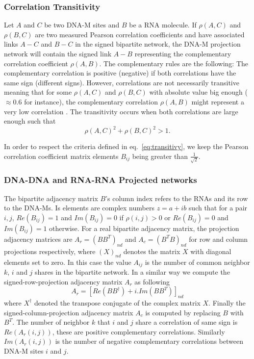 \documentclass[10pt,a4paper]{article}
\begin{document}
\subsubsection{Correlation Transitivity}
Let $A$ and $C$ be two DNA-M sites and $B$ be a RNA molecule. If $\rho(A,C)$ and $\rho(B,C)$ are two measured Pearson correlation coefficients and have associated links $A-C$ and $B-C$ in the signed bipartite network, the DNA-M projection network will contain the signed link $A-B$ representing the complementary correlation coefficient $\rho(A,B)$. The complementary rules are the following: The complementary correlation is positive (negative) if both correlations have the same sign (different signs). However, correlations are not necessarily transitive meaning that for some $\rho(A,C)$ and $\rho(B,C)$ with absolute value big enough ($\approx 0.6$ for instance), the complementary correlation $\rho(A,B)$ might represent a very low correlation \cite{langford12}. The transitivity occurs when both correlations are large enough such that
\begin{equation}
\rho(A,C)^{2} + \rho(B,C)^{2} > 1.
\label{eq:transitivy}
\end{equation}

In order to respect the criteria defined in eq.~\ref{eq:transitivy}, we keep the Pearson correlation coefficient matrix elements $B_{ij}$ being greater than $\frac{1}{\sqrt{2}}$.

\subsubsection{DNA-DNA and RNA-RNA Projected networks}
The bipartite adjacency matrix $B$'s column index refers to the RNAs and its row to the DNA-Ms. Is elements are complex numbers $z=a+ib$ such that for a pair $i,j$, $Re(B_{ij})=1$ and $Im(B_{ij})=0$ if $\rho(i,j)>0$ or $Re(B_{ij})=0$ and $Im(B_{ij})=1$ otherwise. For a real bipartite adjacency matrix, the projection adjacency matrices are $A_{r}=(BB^{T})_{nd}$ and $A_{c}=(B^{T}B)_{nd}$ for row and column projections respectively, where $(X)_{nd}$ denotes the matrix $X$ with diagonal elements set to zero. In this case the value $A_{ij}$ is the number of common neighbor $k$, $i$ and $j$ shares in the bipartite network. In a similar way we compute the signed-row-projection adjacency matrix $A_{r}$ as following
\begin{equation}
A_{r}=[Re(BB^{\dagger}) + i.Im(BB^{T})]_{nd}
\label{eq:signedproj}
\end{equation}
where $X^{\dagger}$ denoted the transpose conjugate of the complex matrix $X$. Finally the signed-column-projection adjacency matrix $A_{c}$ is computed by replacing $B$ with $B^{T}$. The number of neighbor $k$ that $i$ and $j$ share a correlation of same sign is $Re(A_{r}(i,j))$, these are positive complementary correlations. Similarly $Im(A_{r}(i,j))$ is the number of negative complementary correlations between DNA-M sites $i$ and $j$.\\
\end{document}
